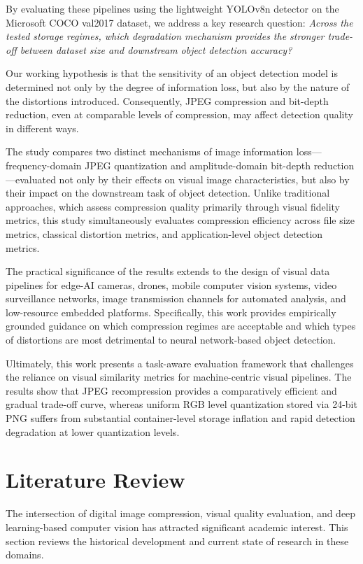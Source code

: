 \documentclass[12pt, a4paper]{article}
\begin{document}
By evaluating these pipelines using the lightweight YOLOv8n detector on the Microsoft COCO val2017 dataset, we address a key research question: \textit{Across the tested storage regimes, which degradation mechanism provides the stronger trade-off between dataset size and downstream object detection accuracy?}

Our working hypothesis is that the sensitivity of an object detection model is determined not only by the degree of information loss, but also by the nature of the distortions introduced. Consequently, JPEG compression and bit-depth reduction, even at comparable levels of compression, may affect detection quality in different ways.

The study compares two distinct mechanisms of image information loss---frequency-domain JPEG quantization and amplitude-domain bit-depth reduction---evaluated not only by their effects on visual image characteristics, but also by their impact on the downstream task of object detection. Unlike traditional approaches, which assess compression quality primarily through visual fidelity metrics, this study simultaneously evaluates compression efficiency across file size metrics, classical distortion metrics, and application-level object detection metrics.

The practical significance of the results extends to the design of visual data pipelines for edge-AI cameras, drones, mobile computer vision systems, video surveillance networks, image transmission channels for automated analysis, and low-resource embedded platforms. Specifically, this work provides empirically grounded guidance on which compression regimes are acceptable and which types of distortions are most detrimental to neural network-based object detection.

Ultimately, this work presents a task-aware evaluation framework that challenges the reliance on visual similarity metrics for machine-centric visual pipelines. The results show that JPEG recompression provides a comparatively efficient and gradual trade-off curve, whereas uniform RGB level quantization stored via 24-bit PNG suffers from substantial container-level storage inflation and rapid detection degradation at lower quantization levels.

\section{Literature Review}
The intersection of digital image compression, visual quality evaluation, and deep learning-based computer vision has attracted significant academic interest. This section reviews the historical development and current state of research in these domains.
\end{document}
